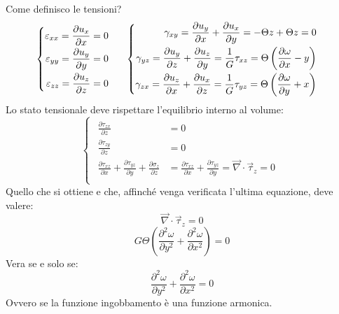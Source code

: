 		Come definisco le tensioni? 
		\[ 
		\begin{cases}
			\begin{aligned}
				\varepsilon_{xx} =   \frac{\partial u_x}{\partial x} = 0 \\
				\varepsilon_{yy} =   \frac{\partial u_y}{\partial y} = 0 \\
				\varepsilon_{zz} =   \frac{\partial u_z}{\partial z} = 0 \\
			\end{aligned}
		\end{cases} \hspace{0.2cm} \begin{cases}
			\begin{aligned}
				\gamma_{xy} =   \frac{\partial u_y}{\partial x} + \frac{\partial u_x}{\partial y} = -\Theta z + \Theta z = 0\\
				\gamma_{yz} =   \frac{\partial u_y}{\partial z} + \frac{\partial u_z}{\partial y} = \dfrac{1}{G} \tau_{xz} = \Theta \left(\dfrac{\partial \omega}{\partial x}-y\right) \\
				\gamma_{zx} =   \frac{\partial u_z}{\partial x} + \frac{\partial u_x}{\partial z} = \dfrac{1}{G} \tau_{yz} = \Theta \left(\dfrac{\partial \omega}{\partial y} + x\right)\\
			\end{aligned}
		\end{cases}
		\]
		Lo stato tensionale deve rispettare l’equilibrio interno al volume:
		\[
		\begin{cases}
			\begin{aligned}
				\frac{\partial \tau_{zx}}{\partial z} & =0 \\
				
				\frac{\partial \tau_{zy}}{\partial z} & =0 \\
				
				\frac{\partial \tau_{xz}}{\partial x} + \frac{\partial \tau_{yz}}{\partial y} + \frac{\partial\sigma_z}{\partial z} & = \frac{\partial \tau_{xz}}{\partial x} + \frac{\partial \tau_{yz}}{\partial y} = \vec{\nabla}\cdot\vec{\tau}_z = 0 \\
			\end{aligned}
		\end{cases}
		\]
		Quello che si ottiene e che, affinché venga verificata l'ultima equazione, deve valere:
		\[ \vec{\nabla}\cdot\vec{\tau}_z = 0 \]
		\[G\Theta\left(\dfrac{\partial^2 \omega}{\partial y^2} + \dfrac{\partial^2 \omega}{\partial x^2} \right)= 0\]
		Vera se e solo se:
		\[ \boxed{\dfrac{\partial^2 \omega}{\partial y^2} + \dfrac{\partial^2 \omega}{\partial x^2} = 0} \]
		Ovvero se la funzione ingobbamento è una funzione armonica. \newline 
		
